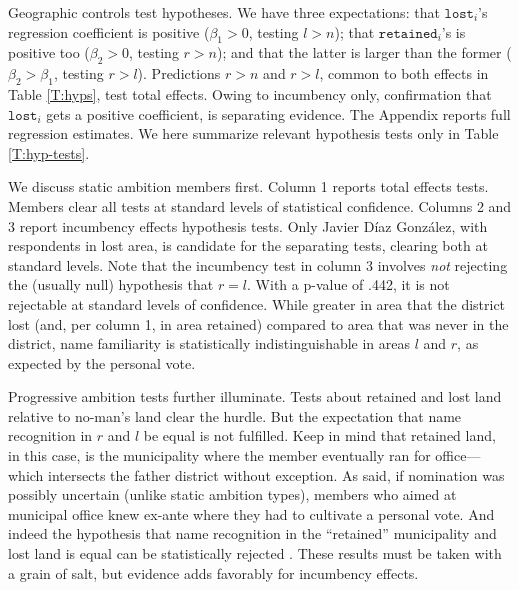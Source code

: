 \documentclass[letter,12pt]{article}
\begin{document}
Geographic controls test hypotheses. We have three expectations: that $\texttt{lost}_i$'s regression coefficient is positive ($\beta_1>0$, testing $l>n$); that $\texttt{retained}_i$'s is positive too ($\beta_2>0$, testing $r>n$); and that the latter is larger than the former ($\beta_2>\beta_1$, testing $r>l$). Predictions $r>n$ and $r>l$, common to both effects in Table \ref{T:hyps}, test total effects. Owing to incumbency only, confirmation that $\texttt{lost}_i$ gets a positive coefficient, is separating evidence. The Appendix reports full regression estimates. We here summarize relevant hypothesis tests only in Table \ref{T:hyp-tests}.

We discuss static ambition members first. Column 1 reports total effects tests. Members clear all tests at standard levels of statistical confidence. Columns 2 and 3 report incumbency effects hypothesis tests. Only Javier Díaz González, with respondents in lost area, is candidate for the separating tests, clearing both at standard levels. Note that the incumbency test in column 3 involves \emph{not} rejecting the (usually null) hypothesis that $r=l$. With a p-value of .442, it is not rejectable at standard levels of confidence. While greater in area that the district lost (and, per column 1, in area retained) compared to area that was never in the district, name familiarity is statistically indistinguishable in areas $l$ and $r$, as expected by the personal vote. 

Progressive ambition tests further illuminate. Tests about retained and lost land relative to no-man's land clear the hurdle. But the expectation that name recognition in $r$ and $l$ be equal is not fulfilled. Keep in mind that retained land, in this case, is the municipality where the member eventually ran for office---which intersects the father district without exception. As said, if nomination was possibly uncertain (unlike static ambition types), members who aimed at municipal office knew ex-ante where they had to cultivate a personal vote. And indeed the hypothesis that name recognition in the ``retained'' municipality and lost land is equal can be statistically rejected \citep[cf.][]{lucardi.micozzi.Career-argentina.2016}. These results must be taken with a grain of salt, but evidence adds favorably for incumbency effects.  
\end{document}
